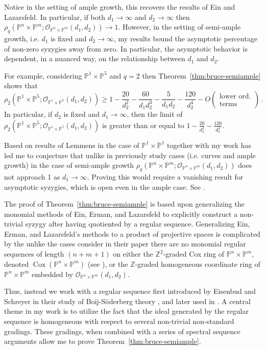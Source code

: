 \documentclass[10pt,reqno]{amsart}
\theoremstyle{remark}
\newcommand{\Cox}{\operatorname{Cox}}
\renewcommand{\O}{\mathcal{O}}
\renewcommand{\P}{\mathbb{P}}
\newcommand{\Z}{\mathbb{Z}}
\begin{document}
Notice in the setting of ample growth, this recovers the results of Ein and Lazarsfeld. In particular, if both $d_{1}\to \infty$ and $d_{2}\to\infty$ then $\rho_{q}\left(\P^{n}\times\P^{m}; \O_{\P^{n}\times\P^{m}}(d_1,d_2)\right)\to 1$. However, in the setting of semi-ample growth, i.e. $d_{1}$ is fixed and $d_{2}\to \infty$, my results bound the asymptotic percentage of non-zero syzygies away from zero. In particular, the asymptotic behavior is dependent, in a nuanced way, on the relationship between $d_{1}$ and $d_{2}$. 

For example, considering $\P^{1}\times\P^{5}$ and $q=2$ then Theorem~\ref{thm:bruce-semiample} shows that 
\[
\rho_{2}\left(\P^{1}\times\P^{5}; \O_{\P^{1}\times\P^{5}}(d_1,d_2)\right)\geq1-\frac{20}{d_2^2}-\frac{60}{d_1d_2^3}-\frac{5}{d_1d_2}-\frac{120}{d_2^4}-O\left(\begin{matrix}\text{lower ord.}\\ \text{terms}\end{matrix}\right)\,.
\]
In particular, if $d_2$ is fixed and $d_1\to\infty$, then the limit of $\rho_{2}\left(\P^{1}\times\P^{5}; \O_{\P^{1}\times\P^{5}}(d_1,d_2)\right)$ is greater than or equal to $1-\frac{20}{d^2_2}-\frac{120}{d_2^4}$.

Based on results of Lemmens in the case of $\P^1\times\P^1$ together with my work has led me to conjecture that unlike in previously study cases (i.e. curves and ample growth) in the case of semi-ample growth $\rho_{q}\left(\P^{n}\times\P^{m}; \O_{\P^{n}\times\P^{m}}(d_1,d_2)\right)$ does not approach 1 as $d_{1}\to \infty$. Proving this would require a vanishing result for asymptotic syzygies, which is open even in the ample case. See \cite[Conjecture~7.1, Conjecture~7.5]{einLazarsfeld12}.

The proof of Theorem~\ref{thm:bruce-semiample} is based upon generalizing the monomial methods of Ein, Erman, and Lazarsfeld to explicitly construct a non-trivial syzygy after having quotiented by a regular sequence. Generalizing Ein, Erman, and Lazarsfeld's methods to a product of projective spaces is complicated by the unlike the cases consider in their paper there are no monomial regular sequences of length $(n+m+1)$ on either the $\Z^2$-graded Cox ring of $\P^{n}\times\P^{m}$, denoted $\Cox(\P^{n}\times\P^{m})$ (see \cite{cox95}), or the $\Z$-graded homogeneous coordinate ring of $\P^{n}\times\P^{m}$ embedded by $\O_{\P^{n}\times\P^{m}}(d_{1},d_{2})$.

Thus, instead we work with a regular sequence first introduced by Eisenbud and Schreyer in their study of Boij-S\"{o}derberg theory \cite{eisenbudSchreyer09}, and later used in \cite{berkesch13, oeding17}. A central theme in my work is to utilize the fact that the ideal generated by the regular sequence is homogeneous with respect to several non-trivial non-standard gradings. These gradings, when combined with a series of spectral sequence arguments allow me to prove Theorem~\ref{thm:bruce-semiample}.
\end{document}
